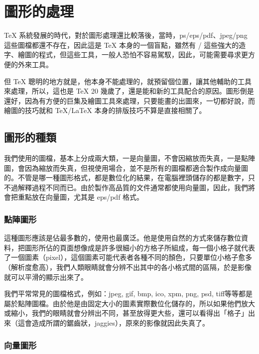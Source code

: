 
\chapter{圖形的處理}
\label{ch:graphic}

\TeX{} 系統發展的時代，對於圖形處理還比較落後，當時，ps/eps/pdf、jpeg/png 這些圖檔都還不存在，因此這是 \TeX{} 本身的一個盲點，雖然有 \MF{}/\MP{} 這些強大的造字、繪圖的程式，但這些工具，一般人恐怕不容易駕馭，因此，可能需要尋求更方便的外來工具。

但 \TeX{} 聰明的地方就是，他本身不能處理的，就預留個位置，讓其他輔助的工具來處理，所以，這也是 \TeX{} 20 幾歲了，還是能和新的工具配合的原因。圖形倒是還好，因為有方便的巨集及繪圖工具來處理，只要能畫的出圖來，一切都好說，而繪圖的技巧就和 \TeX{}/\LaTeX{} 本身的排版技巧不算是直接相關了。

\section{圖形的種類}

我們使用的圖檔，基本上分成兩大類，一是向量圖，不會因縮放而失真，一是點陣圖，會因為縮放而失真，但視使用場合，並不是所有的圖檔都適合製作成向量圖的。不管是哪一種圖形格式，都是數位化的結果，在電腦裡頭儲存的都是數字，只不過解釋過程不同而已。由於製作高品質的文件通常都使用向量圖，因此，我們將會把重點放在向量圖，尤其是 eps/pdf 格式。

\subsection{點陣圖形}

這種圖形應該是佔最多數的，使用也最廣泛。他是使用自然的方式來儲存數位資料，把圖形所佔的頁面想像成是許多很細小的方格子所組成，每一個小格子就代表了一個圖素（pixel），這個圖素可能代表者各種不同的顏色，只要單位小格子愈多（解析度愈高），我們人類眼睛就會分辨不出其中的各小格式間的區隔，於是影像就可以平滑的顯示出來了。

我們平常常見的圖檔格式，例如：jpeg, gif, bmp, ico, xpm, png, psd, tiff\chdots{}等等都是屬於點陣圖檔。由於他是由固定大小的圖素實際數位化儲存的，所以如果他們放大或縮小，我們的眼睛就會分辨出不同，甚至放得更大些，還可以看得出「格子」出來（這會造成所謂的鋸齒狀，jaggies），原來的影像就因此失真了。

\subsection{向量圖形}

